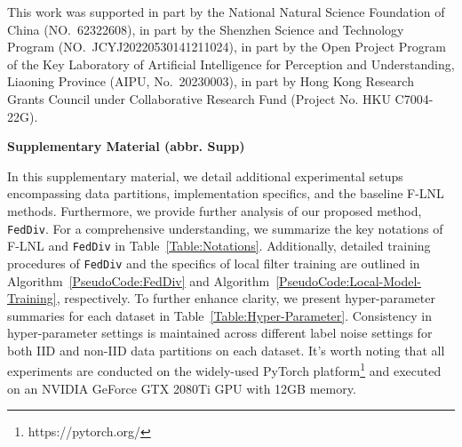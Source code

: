 \documentclass[letterpaper]{article} %
\begin{document}
This work was supported in part by the National Natural Science Foundation of China (NO.~62322608), in part by the Shenzhen Science and Technology Program (NO.~JCYJ20220530141211024), in part by the Open Project Program of the Key Laboratory of Artificial Intelligence for Perception and Understanding, Liaoning Province (AIPU, No.~20230003), in part by Hong Kong Research Grants Council under Collaborative Research Fund (Project No. HKU C7004-22G).



\clearpage

\label{supp}

\begin{strip}
\centering
\textbf{\Large Supplementary Material (abbr. Supp)}
\end{strip}


In this supplementary material, we detail additional experimental setups encompassing data partitions, implementation specifics, and the baseline F-LNL methods. Furthermore, we provide further analysis of our proposed method, \texttt{FedDiv}. For a comprehensive understanding, we summarize the key notations of F-LNL and \texttt{FedDiv} in Table~\textcolor{red}{\ref{Table:Notations}}. Additionally, detailed training procedures of \texttt{FedDiv} and the specifics of local filter training are outlined in Algorithm~\textcolor{red}{\ref{PseudoCode:FedDiv}} and Algorithm~\textcolor{red}{\ref{PseudoCode:Local-Model-Training}}, respectively. To further enhance clarity, we present hyper-parameter summaries for each dataset in Table~\textcolor{red}{\ref{Table:Hyper-Parameter}}. Consistency in hyper-parameter settings is maintained across different label noise settings for both IID and non-IID data partitions on each dataset. It's worth noting that all experiments are conducted on the widely-used PyTorch platform\footnote{https://pytorch.org/} and executed on an NVIDIA GeForce GTX 2080Ti GPU with 12GB memory.
\end{document}
